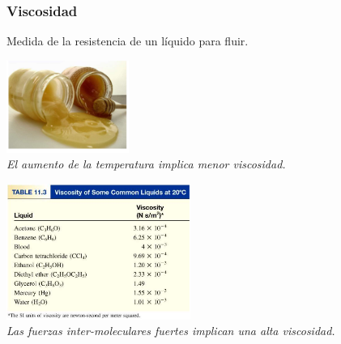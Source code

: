         \subsubsection{Viscosidad}
            \sangria{} Medida de la resistencia de un líquido para fluir.
            \begin{center} 
                \includegraphics[width=4cm]{./imagenes/miel.png} \\[15pt]
                \textit{El aumento de la temperatura implica menor viscosidad.}
            \end{center}
            \begin{center} 
                \includegraphics[width=6cm]{./imagenes/tablaViscosidad.png} \\[15pt]
                \textit{Las fuerzas inter-moleculares fuertes implican una alta viscosidad.}
            \end{center}

